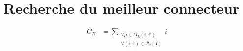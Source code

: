 %	
%	
%
%
%

\section{Recherche du meilleur connecteur}

\begin{align*}
	C_{B} &= \sum_{\substack{\forall \mu \in M_{L}(i, i')\\ \forall (i, i') \in \mathcal{P}_{2}(I)}} i
\end{align*}

